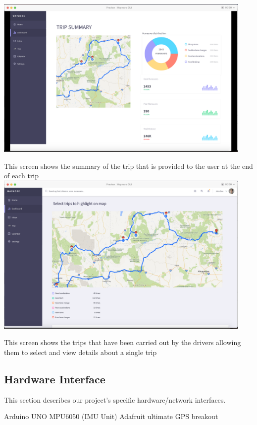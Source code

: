 \begin{center}
\includegraphics[width = 125mm, scale = 1]{images/5.png}

This screen shows the summary of the trip that is provided to the user at the end of each trip\\

\includegraphics[width = 125mm, scale = 1]{images/7.png}

This screen shows the trips that have been carried out by the drivers allowing them to select and view details about a single trip\\
\end{center}

\subsection{Hardware Interface}
This section describes our project's specific hardware/network interfaces.

\begin{outline}

\1 Arduino UNO
\1 MPU6050 (IMU Unit)
\1 Adafruit ultimate GPS breakout

\end{outline}


